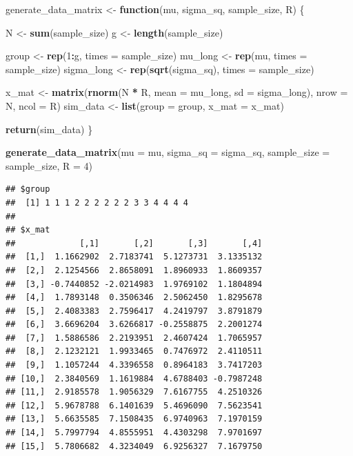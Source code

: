 \documentclass[
]{book}
\newenvironment{Shaded}{\begin{snugshade}}{\end{snugshade}}
\newcommand{\AttributeTok}[1]{\textcolor[rgb]{0.13,0.29,0.53}{#1}}
\newcommand{\ControlFlowTok}[1]{\textcolor[rgb]{0.13,0.29,0.53}{\textbf{#1}}}
\newcommand{\DecValTok}[1]{\textcolor[rgb]{0.00,0.00,0.81}{#1}}
\newcommand{\FunctionTok}[1]{\textcolor[rgb]{0.13,0.29,0.53}{\textbf{#1}}}
\newcommand{\NormalTok}[1]{#1}
\newcommand{\OtherTok}[1]{\textcolor[rgb]{0.56,0.35,0.01}{#1}}
\newcommand{\SpecialCharTok}[1]{\textcolor[rgb]{0.81,0.36,0.00}{\textbf{#1}}}
\begin{document}
\begin{Shaded}
\begin{Highlighting}[]
\NormalTok{generate\_data\_matrix }\OtherTok{\textless{}{-}} \ControlFlowTok{function}\NormalTok{(mu, sigma\_sq, sample\_size, R) \{}

\NormalTok{  N }\OtherTok{\textless{}{-}} \FunctionTok{sum}\NormalTok{(sample\_size) }
\NormalTok{  g }\OtherTok{\textless{}{-}} \FunctionTok{length}\NormalTok{(sample\_size) }
  
\NormalTok{  group }\OtherTok{\textless{}{-}} \FunctionTok{rep}\NormalTok{(}\DecValTok{1}\SpecialCharTok{:}\NormalTok{g, }\AttributeTok{times =}\NormalTok{ sample\_size) }
\NormalTok{  mu\_long }\OtherTok{\textless{}{-}} \FunctionTok{rep}\NormalTok{(mu, }\AttributeTok{times =}\NormalTok{ sample\_size)}
\NormalTok{  sigma\_long }\OtherTok{\textless{}{-}} \FunctionTok{rep}\NormalTok{(}\FunctionTok{sqrt}\NormalTok{(sigma\_sq), }\AttributeTok{times =}\NormalTok{ sample\_size) }

\NormalTok{  x\_mat }\OtherTok{\textless{}{-}} \FunctionTok{matrix}\NormalTok{(}\FunctionTok{rnorm}\NormalTok{(N }\SpecialCharTok{*}\NormalTok{ R, }\AttributeTok{mean =}\NormalTok{ mu\_long, }\AttributeTok{sd =}\NormalTok{ sigma\_long),}
                  \AttributeTok{nrow =}\NormalTok{ N, }\AttributeTok{ncol =}\NormalTok{ R)}
\NormalTok{  sim\_data }\OtherTok{\textless{}{-}} \FunctionTok{list}\NormalTok{(}\AttributeTok{group =}\NormalTok{ group, }\AttributeTok{x\_mat =}\NormalTok{ x\_mat)}
    
  \FunctionTok{return}\NormalTok{(sim\_data)}
\NormalTok{\}}

\FunctionTok{generate\_data\_matrix}\NormalTok{(}\AttributeTok{mu =}\NormalTok{ mu, }\AttributeTok{sigma\_sq =}\NormalTok{ sigma\_sq,}
                     \AttributeTok{sample\_size =}\NormalTok{ sample\_size, }\AttributeTok{R =} \DecValTok{4}\NormalTok{)}
\end{Highlighting}
\end{Shaded}

\begin{verbatim}
## $group
##  [1] 1 1 1 2 2 2 2 2 2 3 3 4 4 4 4
## 
## $x_mat
##             [,1]       [,2]       [,3]       [,4]
##  [1,]  1.1662902  2.7183741  5.1273731  3.1335132
##  [2,]  2.1254566  2.8658091  1.8960933  1.8609357
##  [3,] -0.7440852 -2.0214983  1.9769102  1.1804894
##  [4,]  1.7893148  0.3506346  2.5062450  1.8295678
##  [5,]  2.4083383  2.7596417  4.2419797  3.8791879
##  [6,]  3.6696204  3.6266817 -0.2558875  2.2001274
##  [7,]  1.5886586  2.2193951  2.4607424  1.7065957
##  [8,]  2.1232121  1.9933465  0.7476972  2.4110511
##  [9,]  1.1057244  4.3396558  0.8964183  3.7417203
## [10,]  2.3840569  1.1619884  4.6788403 -0.7987248
## [11,]  2.9185578  1.9056329  7.6167755  4.2510326
## [12,]  5.9678788  6.1401639  5.4696090  7.5623541
## [13,]  5.6635585  7.1508435  6.9740963  7.1970159
## [14,]  5.7997794  4.8555951  4.4303298  7.9701697
## [15,]  5.7806682  4.3234049  6.9256327  7.1679750
\end{verbatim}
\end{document}
